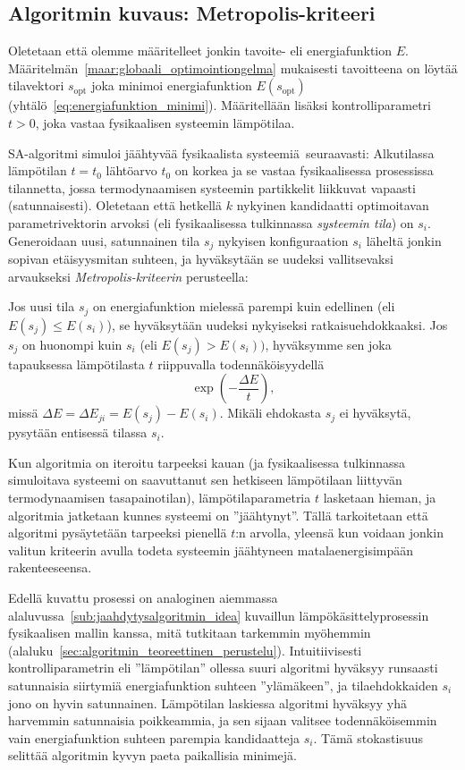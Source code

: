 \subsection{Algoritmin kuvaus: Metropolis-kriteeri}
\label{sub:algoritmin_kuvaus_metropolis_kriteeri}

Oletetaan että olemme määritelleet jonkin tavoite- eli energiafunktion $E$.
Määritelmän~\ref{maar:globaali_optimointiongelma} mukaisesti
tavoitteena on löytää tilavektori $s_\text{opt}$ joka minimoi energiafunktion $E(s_\text{opt})$ (yhtälö~\ref{eq:energiafunktion_minimi}).
Määritellään lisäksi kontrolliparametri $t > 0$,
joka vastaa fysikaalisen systeemin lämpötilaa.

SA-algoritmi simuloi jäähtyvää fysikaalista systeemiä seuraavasti:
Alkutilassa lämpötilan $t = t_0$ lähtöarvo $t_0$ on korkea ja se vastaa fysikaalisessa prosessissa tilannetta, jossa termodynaamisen systeemin partikkelit liikkuvat vapaasti (satunnaisesti).
Oletetaan että hetkellä $k$ nykyinen kandidaatti optimoitavan parametrivektorin arvoksi (eli fysikaalisessa tulkinnassa \emph{systeemin tila}) on $s_i$.
Generoidaan uusi, satunnainen tila $s_j$ nykyisen konfiguraation $s_i$ läheltä jonkin sopivan etäisyysmitan suhteen,
ja hyväksytään se uudeksi vallitsevaksi arvaukseksi \emph{Metropolis-kriteerin} perusteella:

Jos uusi tila $s_j$ on energiafunktion mielessä parempi kuin edellinen (eli $E(s_j) \leq E(s_i)$), se hyväksytään uudeksi nykyiseksi ratkaisuehdokkaaksi.
Jos $s_j$ on huonompi kuin $s_i$ (eli $E(s_j) > E(s_i))$, hyväksymme sen joka tapauksessa lämpötilasta $t$ riippuvalla todennäköisyydellä
\begin{equation}
    \exp\left(-\frac{\Delta E}{t}\right),
\end{equation}
missä $\Delta E = \Delta E_{ji} = E(s_j) - E(s_i)$.
Mikäli ehdokasta $s_j$ ei hyväksytä, pysytään entisessä tilassa $s_i$.

Kun algoritmia on iteroitu tarpeeksi kauan (ja fysikaalisessa tulkinnassa simuloitava systeemi on saavuttanut sen hetkiseen lämpötilaan liittyvän termodynaamisen tasapainotilan), lämpötilaparametria $t$ lasketaan hieman, ja algoritmia jatketaan kunnes systeemi on ''jäähtynyt''.
Tällä tarkoitetaan että algoritmi pysäytetään tarpeeksi pienellä $t$:n arvolla, yleensä kun voidaan jonkin valitun kriteerin avulla todeta systeemin jäähtyneen matalaenergisimpään rakenteeseensa.

Edellä kuvattu prosessi on analoginen aiemmassa alaluvussa~\ref{sub:jaahdytysalgoritmin_idea} kuvaillun lämpökäsittelyprosessin fysikaalisen mallin kanssa,
mitä tutkitaan tarkemmin myöhemmin (alaluku~\ref{sec:algoritmin_teoreettinen_perustelu}).
Intuitiivisesti kontrolliparametrin eli ''lämpötilan'' ollessa suuri algoritmi hyväksyy runsaasti satunnaisia siirtymiä energiafunktion suhteen ''ylämäkeen'', ja tilaehdokkaiden $s_i$ jono on hyvin satunnainen.
Lämpötilan laskiessa algoritmi hyväksyy yhä harvemmin satunnaisia poikkeammia, ja sen sijaan valitsee todennäköisemmin vain energiafunktion suhteen parempia kandidaatteja $s_i$.
Tämä stokastisuus selittää algoritmin kyvyn paeta paikallisia minimejä.

